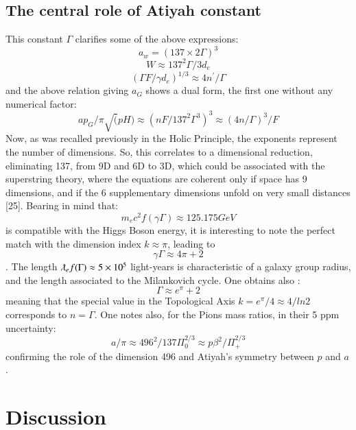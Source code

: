 \documentclass[twoside,draft]{article}
\begin{document}
\begin{sloppypar}
{\subsection {The central role of Atiyah constant}
This constant $\Gamma$ clarifies some of the above expressions:
\begin{equation}
a_{w} = (137 \times 2 \Gamma)^{3}
\end{equation}
\begin{equation}
W \approx 137^{2} \Gamma / 3d_{e}
\end{equation}
\begin{equation}
( \Gamma F/\gamma d_{e})^{1/3} \approx 4n^{\prime} / \Gamma
\end{equation}
and the above relation giving $a_{G}$ shows a dual form, the first one without any numerical factor:
\begin{equation}
ap_{G} / \pi \sqrt(pH) \approx (n F/137^{2} \Gamma^{3} )^{3} \approx (4n/ \Gamma)^{3}/F
\end{equation}
Now, as was recalled previously in the Holic Principle, the exponents represent the number of
dimensions. So, this correlates to a dimensional reduction, eliminating 137, from 9D and 6D to
3D, which could be associated with the superstring theory, where the equations are coherent only if space
has 9 dimensions, and if the 6 supplementary dimensions unfold on very small distances [25].
Bearing in mind that:
\begin{equation}
m_{e} c^{2} f(\gamma\Gamma) \approx 125.175 GeV
\end{equation}
is compatible with the Higgs Boson energy, it is interesting to note the perfect match with the dimension index $k \approx \pi$, leading to $$\gamma\Gamma \approx 4\pi + 2$$. The length $\lambdabar_{e} f(\Gamma) \approx 5\times 10^{5}$ light-years is characteristic of a galaxy group radius, and the length associated to the Milankovich cycle. One obtains also :
$$\Gamma \approx e^\pi + 2$$
meaning that the special value in the Topological Axis $k = e^{\pi} /4 \approx 4/ln2$ corresponds to $n = \Gamma$.
One notes also, for the Pions mass ratios, in their 5 ppm uncertainty:
$$a/\pi\approx 496^2/137\Pi_0^{2/3} \approx p\beta^2/\Pi_+^{2/3}$$
confirming the role of the dimension 496 and Atiyah's symmetry between $p$ and $a$. 

\section {Discussion}

}
\end{sloppypar}
\end{document}
